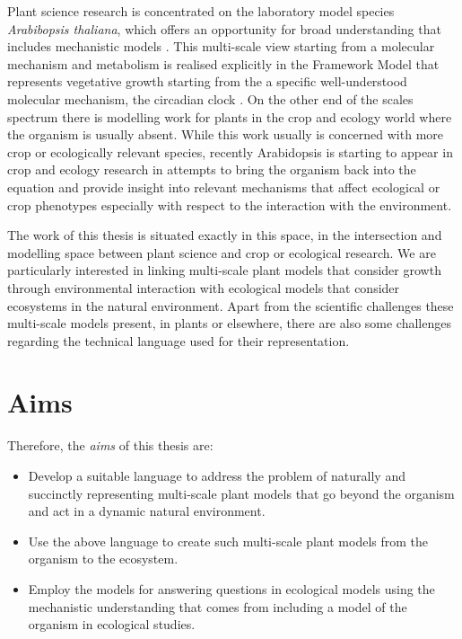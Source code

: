 Plant science research is concentrated on the laboratory model species
\emph{Arabibopsis thaliana}, which offers an opportunity for broad understanding
that includes mechanistic models \citep{chew_mathematical_2014,
  voss_modelling_2014}. This multi-scale view starting from a molecular
mechanism and metabolism is realised explicitly in the Framework Model that
represents vegetative growth starting from the a specific well-understood
molecular mechanism, the circadian clock \citep[FMv1]{chew_multiscale_2014}. On
the other end of the scales spectrum there is modelling work for plants in the
crop and ecology world where the organism is usually absent. While this work
usually is concerned with more crop or ecologically relevant species, recently
Arabidopsis is starting to appear in crop and ecology research in attempts to
bring the organism back into the equation and provide insight into relevant
mechanisms that affect ecological or crop phenotypes especially with respect to
the interaction with the environment.

The work of this thesis is situated exactly in this space, in the intersection
and modelling space between plant science and crop or ecological
research. We are particularly interested in linking multi-scale plant models
that consider growth through environmental interaction with ecological models
that consider ecosystems in the natural environment.  Apart from the scientific
challenges these multi-scale models present, in plants or elsewhere, there are
also some challenges regarding the technical language used for their
representation.

\section{Aims}
\label{sec:aims}
Therefore, the \emph{aims} of this thesis are:
\begin{itemize}
\item Develop a suitable language to address the problem of naturally and
  succinctly representing multi-scale plant models that go beyond the organism
  and act in a dynamic natural environment.
\item Use the above language to create such multi-scale plant models from the
  organism to the ecosystem.
\item Employ the models for answering questions in ecological models using the
  mechanistic understanding that comes from including a model of the organism in
  ecological studies.
\end{itemize}

